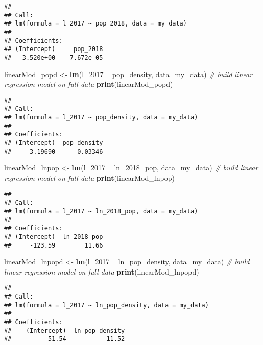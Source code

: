 \documentclass[]{article}
\newenvironment{Shaded}{\begin{snugshade}}{\end{snugshade}}
\newcommand{\CommentTok}[1]{\textcolor[rgb]{0.56,0.35,0.01}{\textit{#1}}}
\newcommand{\DataTypeTok}[1]{\textcolor[rgb]{0.13,0.29,0.53}{#1}}
\newcommand{\DecValTok}[1]{\textcolor[rgb]{0.00,0.00,0.81}{#1}}
\newcommand{\KeywordTok}[1]{\textcolor[rgb]{0.13,0.29,0.53}{\textbf{#1}}}
\newcommand{\NormalTok}[1]{#1}
\newcommand{\OperatorTok}[1]{\textcolor[rgb]{0.81,0.36,0.00}{\textbf{#1}}}
\newcommand{\StringTok}[1]{\textcolor[rgb]{0.31,0.60,0.02}{#1}}
\begin{document}
\begin{verbatim}
## 
## Call:
## lm(formula = l_2017 ~ pop_2018, data = my_data)
## 
## Coefficients:
## (Intercept)     pop_2018  
##  -3.520e+00    7.672e-05
\end{verbatim}

\begin{Shaded}
\begin{Highlighting}[]
\NormalTok{linearMod_popd <-}\StringTok{ }\KeywordTok{lm}\NormalTok{(l_}\DecValTok{2017} \OperatorTok{~}\StringTok{ }\NormalTok{pop_density, }\DataTypeTok{data=}\NormalTok{my_data)  }\CommentTok{# build linear regression model on full data}
\KeywordTok{print}\NormalTok{(linearMod_popd)}
\end{Highlighting}
\end{Shaded}

\begin{verbatim}
## 
## Call:
## lm(formula = l_2017 ~ pop_density, data = my_data)
## 
## Coefficients:
## (Intercept)  pop_density  
##    -3.19690      0.03346
\end{verbatim}

\begin{Shaded}
\begin{Highlighting}[]
\NormalTok{linearMod_lnpop <-}\StringTok{ }\KeywordTok{lm}\NormalTok{(l_}\DecValTok{2017} \OperatorTok{~}\StringTok{ }\NormalTok{ln_}\DecValTok{2018}\NormalTok{_pop, }\DataTypeTok{data=}\NormalTok{my_data)  }\CommentTok{# build linear regression model on full data}
\KeywordTok{print}\NormalTok{(linearMod_lnpop)}
\end{Highlighting}
\end{Shaded}

\begin{verbatim}
## 
## Call:
## lm(formula = l_2017 ~ ln_2018_pop, data = my_data)
## 
## Coefficients:
## (Intercept)  ln_2018_pop  
##     -123.59        11.66
\end{verbatim}

\begin{Shaded}
\begin{Highlighting}[]
\NormalTok{linearMod_lnpopd <-}\StringTok{ }\KeywordTok{lm}\NormalTok{(l_}\DecValTok{2017} \OperatorTok{~}\StringTok{ }\NormalTok{ln_pop_density, }\DataTypeTok{data=}\NormalTok{my_data)  }\CommentTok{# build linear regression model on full data}
\KeywordTok{print}\NormalTok{(linearMod_lnpopd)}
\end{Highlighting}
\end{Shaded}

\begin{verbatim}
## 
## Call:
## lm(formula = l_2017 ~ ln_pop_density, data = my_data)
## 
## Coefficients:
##    (Intercept)  ln_pop_density  
##         -51.54           11.52
\end{verbatim}
\end{document}
